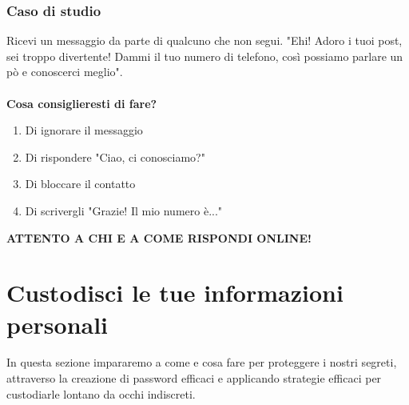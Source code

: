 \documentclass{article}
\begin{document}
\subsubsection{Caso di studio}
\label{sec:Caso12}
Ricevi un messaggio da parte di qualcuno che non segui. "Ehi! Adoro i tuoi post, sei troppo divertente! Dammi il tuo numero di telefono, così possiamo parlare un pò e conoscerci meglio".
\\\vspace{5mm}\\
\textbf{Cosa consiglieresti di fare?}
\begin{enumerate}
	\item Di ignorare il messaggio
	\item Di rispondere "Ciao, ci conosciamo?"
	\item Di bloccare il contatto
	\item Di scrivergli "Grazie! Il mio numero è..."
\end{enumerate}

\begin{center}
	\begin{huge}
		\textbf{ATTENTO A CHI E A COME RISPONDI ONLINE!}
	\end{huge}
\end{center}

\pagebreak

\section{Custodisci le tue informazioni personali}
In questa sezione impararemo a come e cosa fare per proteggere i nostri segreti, attraverso la creazione di password efficaci e applicando strategie efficaci per custodiarle lontano da occhi indiscreti.
\end{document}
